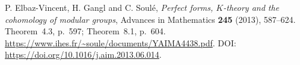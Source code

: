 P. Elbaz-Vincent, H. Gangl and C. Soul\'e,
\emph{Perfect forms, $K$-theory and the cohomology of modular groups},
Advances in Mathematics \textbf{245} (2013), 587--624.
Theorem~4.3, p.~597; Theorem~8.1, p.~604.
\url{https://www.ihes.fr/~soule/documents/YAIMA4438.pdf}.
DOI: \url{https://doi.org/10.1016/j.aim.2013.06.014}.
